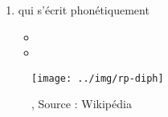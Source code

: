 \begin{enumerate}
  
\item {} qui s'écrit
  phonétiquement
  \href{https://dictionary.cambridge.org/dictionary/english/care}{}

  \begin{itemize}
  \item{}
  \item{}
  \end{itemize}

  
\end{enumerate}

\begin{center}
  \begin{figure}[h]
    \centering
    \texttt{[image: ../img/rp-diph]}
    \caption[]{, Source : Wikipédia}
    \label{fig:front-vowels-in-the-mouth}
  \end{figure}
\end{center}

\newpage
\minitoc
